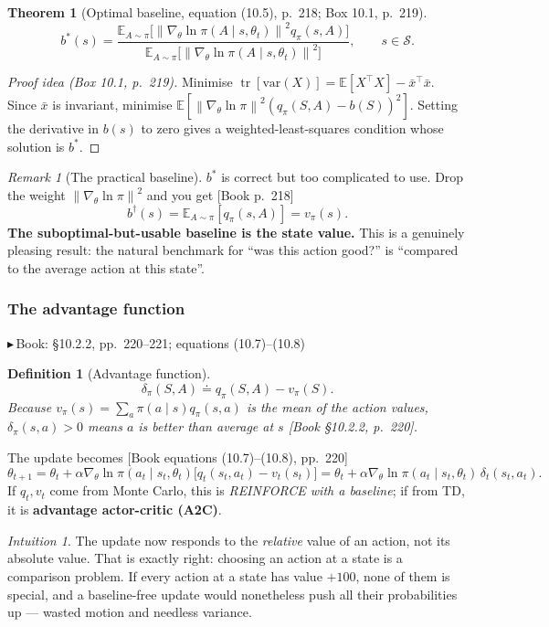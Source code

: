 \documentclass[11pt, letterpaper]{article}
\theoremstyle{runin}
\newtheorem*{definition}{Definition}
\theoremstyle{runinplain}
\newtheorem{theorem}{Theorem}[section]
\theoremstyle{remark}
\newtheorem*{remark}{Remark}
\newtheorem*{intuition}{Intuition}
\newcommand{\E}{\mathbb{E}}
\newcommand{\Var}{\mathrm{var}}
\newcommand{\norm}[1]{\left\lVert #1 \right\rVert}
\newcommand{\Sspace}{\mathcal{S}}
\DeclareMathOperator{\Tr}{tr}
\newcommand{\bk}[1]{{\color{bookblue}\small$\blacktriangleright$\,\textsf{Book: #1}}}
\newcommand{\bkin}[1]{{\color{bookblue}\small[\textsf{Book #1}]}}
\begin{document}
\begin{theorem}[Optimal baseline, equation (10.5), p.~218; Box 10.1, p.~219]
\[
  b^*(s)=\frac{\E_{A\sim\pi}\bigl[\norm{\nabla_\theta\ln\pi(A\mid s,\theta_t)}^2q_\pi(s,A)\bigr]}
              {\E_{A\sim\pi}\bigl[\norm{\nabla_\theta\ln\pi(A\mid s,\theta_t)}^2\bigr]},
  \qquad s\in\Sspace .
\]
\end{theorem}

\begin{proof}[Proof idea (Box 10.1, p.~219)]
Minimise $\Tr[\Var(X)]=\E[X^{\!\top}X]-\bar x^{\!\top}\bar x$. Since $\bar x$ is
invariant, minimise
$\E[\norm{\nabla_\theta\ln\pi}^2(q_\pi(S,A)-b(S))^2]$. Setting the derivative in
$b(s)$ to zero gives a weighted-least-squares condition whose solution is $b^*$.
\end{proof}

\begin{remark}[The practical baseline]
$b^*$ is correct but too complicated to use. Drop the weight
$\norm{\nabla_\theta\ln\pi}^2$ and you get \bkin{p.~218}
\[
  b^\dagger(s)=\E_{A\sim\pi}[q_\pi(s,A)]=v_\pi(s).
\]
\textbf{The suboptimal-but-usable baseline is the state value.} This is a genuinely
pleasing result: the natural benchmark for ``was this action good?'' is ``compared to
the average action at this state''.
\end{remark}

\subsubsection{The advantage function}

\bk{\S10.2.2, pp.~220--221; equations (10.7)--(10.8)}

\begin{definition}[Advantage function]
\[
  \delta_\pi(S,A)\doteq q_\pi(S,A)-v_\pi(S).
\]
Because $v_\pi(s)=\sum_a\pi(a\mid s)q_\pi(s,a)$ is the mean of the action values,
$\delta_\pi(s,a)>0$ means $a$ is better than average at $s$
\bkin{\S10.2.2, p.~220}.
\end{definition}

The update becomes \bkin{equations (10.7)--(10.8), pp.~220}
\[
  \theta_{t+1}=\theta_t+\alpha\nabla_\theta\ln\pi(a_t\mid s_t,\theta_t)\bigl[q_t(s_t,a_t)-v_t(s_t)\bigr]
  =\theta_t+\alpha\nabla_\theta\ln\pi(a_t\mid s_t,\theta_t)\,\delta_t(s_t,a_t).
\]
If $q_t,v_t$ come from Monte Carlo, this is \emph{REINFORCE with a baseline}; if from
TD, it is \textbf{advantage actor-critic (A2C)}.

\begin{intuition}
The update now responds to the \emph{relative} value of an action, not its absolute
value. That is exactly right: choosing an action at a state is a comparison problem.
If every action at a state has value $+100$, none of them is special, and a
baseline-free update would nonetheless push all their probabilities up --- wasted
motion and needless variance.
\end{intuition}
\end{document}
